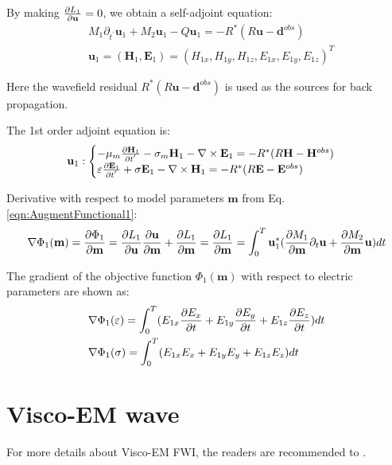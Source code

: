 \documentclass[pdftex,a4paper,parskip,listof=totoc,bibliography=totoc,onehalfspacing,12pt]{scrreprt}
\begin{document}
\par By making $\pdv{L_1}{\mathbf{u}} = 0$, we obtain a self-adjoint equation:
\begin{equation}
\begin{aligned}
\label{eqn:AdjointEquation1}
 &M_1 \partial_{t^{'}} \mathbf{u}_{1}  + M_2 \mathbf{u}_{1} - Q \mathbf{u}_{1} = - R^{*}(R\mathbf{u} - \mathbf{d}^{obs})\\
& \mathbf{u}_{1} = ( \mathbf{H}_{1}, \mathbf{E}_{1}) = (H_{1x}, H_{1y}, H_{1z}, E_{1x}, E_{1y}, E_{1z})^T 
\end{aligned}
\end{equation}
\par Here the wavefield residual $R^{*}(R\mathbf{u} - \mathbf{d}^{obs}) $ is used as the sources for back propagation. \\
\par The 1st order adjoint equation is:
\begin{equation}
\label{eqn:AdjointEquation11}
\mathbf{u}_{1}:
\begin{cases}
-\mu_{m} \pdv{\mathbf{H}_{1}}{t^{'}} - \sigma_{m}\mathbf{H}_{1} - \nabla \times\mathbf{E}_{1} =  -R^{*}(R\mathbf{H} - \mathbf{H}^{obs}) \\
\varepsilon\pdv{\mathbf{E}_{1}}{t^{'}} + \sigma\mathbf{E}_{1} -\nabla \times \mathbf{H}_{1} =  - R^{*}(R\mathbf{E} - \mathbf{E}^{obs})
\end{cases}
\end{equation}
\par Derivative with respect to model parameters $\mathbf{m}$ from Eq. \ref{eqn:AugmentFunctional1}:
\begin{equation}
 \nabla \Phi_1(\mathbf{m})=\pdv{\Phi_1}{\mathbf{m}} = \pdv{L_1}{\mathbf{u}}\pdv{\mathbf{u}}{\mathbf{m}} + \pdv{L_1}{\mathbf{m}} =  \pdv{L_1}{\mathbf{m}} = \int_0^T \mathbf{u}_{1}^{*} (\pdv{M_{1}}{\mathbf{m}} \partial_{t}\mathbf{u} + \pdv{M_{2}}{\mathbf{m}} \mathbf{u} ) dt\\ 
\end{equation}
\par The gradient of the objective function $\Phi_1(\mathbf{m})$ with respect to electric parameters are shown as:
\begin{equation}
\label{eqn:GradientAdjoint1}
\begin{aligned}
& \nabla \Phi_1(\varepsilon) = \int_0^T ( E_{1x} \pdv{E_x}{t} + E_{1y} \pdv{E_y}{t} + E_{1z} \pdv{E_z}{t} ) dt\\
& \nabla \Phi_1(\sigma) = \int_0^T ( E_{1x} E_x + E_{1y} E_y + E_{1z} E_z  ) dt\\
\end{aligned}
\end{equation}

\chapter{Visco-EM wave}
\label{sec:Visco_EM_wave_equation}
For more details about Visco-EM FWI, the readers are recommended to \cite{qin2020full}.
\end{document}
